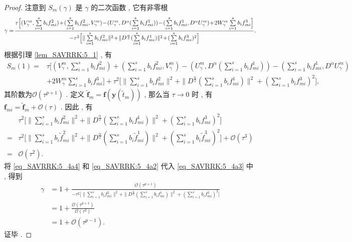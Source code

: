 \begin{proof}
注意到 $S_m(\gamma)$ 是 $\gamma$ 的二次函数 , 它有非零根
\begin{equation}\label{eq_SAVRRK:5_4a3}\small
	\gamma=\!\frac{\tau\Big[(V_{\gamma}^{m} , \sum\limits_{i=1}^{s}b_if_{mi}^2)\!+\!(\sum\limits_{i=1}^{s}b_if_{mi}^2 , V_{\gamma}^{m})\!-\!(U_{\gamma}^{m} , D^{\alpha} (\sum\limits_{i=1}^{s}b_if_{mi}^1))\!-\!(\sum\limits_{i=1}^{s}b_if_{mi}^1 , D^{\alpha} U_{\gamma}^{m})\!+\!2W_{\gamma}^{m}\sum\limits_{i=1}^{s}b_if_{mi}^3\Big]}{-\tau^2\Big[\|\sum\limits_{i=1}^{s}b_if_{mi}^2\|^2\!+\! \|D^\frac{\alpha}{2}(\sum\limits_{i=1}^{s}b_if_{mi}^1)\|^2\!+\!(\sum\limits_{i=1}^{s}b_if_{mi}^3)^2\Big]} . 
\end{equation}
根据引理 \ref{lem_SAVRRK:5_1} , 有
\begin{align}\label{eq_SAVRRK:5_4a2}
	S_m(1)=&\tau\Big[(V_{\gamma}^{m} , \sum\limits_{i=1}^{s}b_if_{mi}^2)+(\sum\limits_{i=1}^{s}b_if_{mi}^2 , V_{\gamma}^{m})-(U_{\gamma}^{m} , D^{\alpha} (\sum\limits_{i=1}^{s}b_if_{mi}^1))-(\sum\limits_{i=1}^{s}b_if_{mi}^1 , D^{\alpha} U_{\gamma}^{m})\nonumber\\
	&+2W_{\gamma}^{m}\sum\limits_{i=1}^{s}b_if_{mi}^3\Big]+\tau^2\Big[\|\sum\limits_{i=1}^{s}b_if_{mi}^2\|^2+ \|D^\frac{\alpha}{2}(\sum\limits_{i=1}^{s}b_if_{mi}^1)\|^2+(\sum\limits_{i=1}^{s}b_if_{mi}^3)^2\Big] , 
\end{align}
其阶数为$\mathcal{O}(\tau^{p+1})$  . 
定义 $\tilde{\bm{f}}_m=\bm{f}\left(\bm{y}\left(\tilde{t}_m\right)\right)$ , 那么当 $\tau\rightarrow 0$ 时 , 有 $\bm{f}_{m i}=\tilde{\bm{f}}_m+\mathcal{O}(\tau)$ . 
因此 , 有
\begin{align}\label{eq_SAVRRK:5_4a4}
	&\tau^2\Big[\|\sum\limits_{i=1}^{s}b_if_{mi}^2\|^2+ \|D^\frac{\alpha}{2}(\sum\limits_{i=1}^{s}b_if_{mi}^1)\|^2+(\sum\limits_{i=1}^{s}b_if_{mi}^3)^2\Big]\nonumber\\
	=&\tau^2\Big[\|\sum\limits_{i=1}^{s}b_i\tilde{f}_{mi}^2\|^2+ \|D^\frac{\alpha}{2}(\sum\limits_{i=1}^{s}b_i\tilde{f}_{mi}^1)\|^2+(\sum\limits_{i=1}^{s}b_i\tilde{f}_{mi}^3)^2\Big]+\mathcal{O}(\tau^3)\nonumber\\
	=&\mathcal{O}(\tau^2) . 
\end{align}
将 \eqref{eq_SAVRRK:5_4a4} 和 \eqref{eq_SAVRRK:5_4a2} 代入 \eqref{eq_SAVRRK:5_4a3} 中 , 得到
\begin{align}\label{eq_SAVRRK:5_4a5}
	\gamma&=1+\frac{\mathcal{O}(\tau^{p+1})}{-\tau^2\Big[\|\sum\limits_{i=1}^{s}b_if_{mi}^2\|^2+ \|D^\frac{\alpha}{2}(\sum\limits_{i=1}^{s}b_if_{mi}^1)\|^2+(\sum\limits_{i=1}^{s}b_if_{mi}^3)^2\Big]}\nonumber\\
	&=1+\frac{\mathcal{O}(\tau^{p+1})}{\mathcal{O}(\tau^2)}\nonumber\\
	&=1+\mathcal{O}(\tau^{p-1}) . 
\end{align}
证毕 . 
\end{proof}

